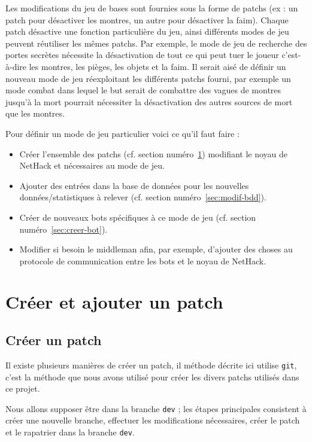 \documentclass[10pt,a4paper]{report}
\begin{document}
Les modifications du jeu de bases sont fournies sous la forme de patchs (ex :
un patch pour désactiver les montres, un autre pour désactiver la faim).
Chaque patch désactive une fonction particulière du jeu, ainsi différents
modes de jeu peuvent réutiliser les mêmes patchs. Par exemple, le mode de jeu
de recherche des portes secrètes nécessite la désactivation de tout ce qui
peut tuer le joueur c'est-à-dire les montres, les pièges, les objets et la
faim. Il serait aisé de définir un nouveau mode de jeu réexploitant les
différents patchs fourni, par exemple un mode combat dans lequel le but serait
de combattre des vagues de montres jusqu'à la mort pourrait nécessiter la
désactivation des autres sources de mort que les montres.

Pour définir un mode de jeu particulier voici ce qu'il faut faire :
\begin{itemize}
	\item Créer l'ensemble des patchs (cf. section numéro~\ref{sec:creer-patch}) modifiant le noyau de NetHack et nécessaires au mode de jeu.
	\item Ajouter des entrées dans la base de données pour les nouvelles données/statistiques à relever (cf. section numéro~\ref{sec:modif-bdd}).
	\item Créer de nouveaux bots spécifiques à ce mode de jeu (cf. section numéro~\ref{sec:creer-bot}).
	\item Modifier si besoin le middleman afin, par exemple, d'ajouter des choses au protocole de communication entre les bots et le noyau de NetHack.
\end{itemize}

\section{Créer et ajouter un patch} \label{sec:creer-patch}

\subsection{Créer un patch}
Il existe plusieurs manières de créer un patch, il méthode décrite ici utilise
\verb!git!, c'est la méthode que nous avons utilisé pour créer les divers
patchs utilisés dans ce projet.

Nous allons supposer être dans la branche \verb!dev! ; les étapes principales
consistent à créer une nouvelle branche, effectuer les modifications
nécessaires, créer le patch et le rapatrier dans la branche \verb!dev!.
\end{document}
